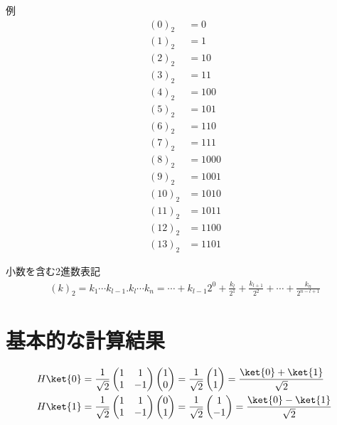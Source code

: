 \documentclass[]{ltjsarticle}
\begin{document}
例
\begin{align}
    (0)_2 &= 0 \\
    (1)_2 &= 1 \\
    (2)_2 &= 10 \\
    (3)_2 &= 11 \\
    (4)_2 &= 100 \\
    (5)_2 &= 101 \\
    (6)_2 &= 110 \\
    (7)_2 &= 111 \\
    (8)_2 &= 1000 \\
    (9)_2 &= 1001 \\
    (10)_2 &= 1010 \\
    (11)_2 &= 1011 \\
    (12)_2 &= 1100 \\
    (13)_2 &= 1101
\end{align}

小数を含む2進数表記
\begin{align}
    (k)_2 
    =
    k_1 \cdots k_{l-1}. k_l \cdots k_n
    =
    \cdots + k_{l-1} 2^{0}
    +
    \frac{k_l}{2^1}
    +
    \frac{k_{l+1}}{2^2}
    +
    \cdots
    +
    \frac{k_n}{2^{n-l+1}}
\end{align}


\section{基本的な計算結果}
\begin{align}
    H \ket{0}
    &=
    \frac{1}{\sqrt{2}}
    \begin{pmatrix}
        1 & 1 \\
        1 & -1
    \end{pmatrix}
    \begin{pmatrix}
        1 \\ 0
    \end{pmatrix}
    =
    \frac{1}{\sqrt{2}}
    \begin{pmatrix}
        1 \\ 1
    \end{pmatrix}
    =
    \frac{\ket{0} + \ket{1}}{\sqrt{2}} \\
    H \ket{1}
    &=
    \frac{1}{\sqrt{2}}
    \begin{pmatrix}
        1 & 1 \\
        1 & -1
    \end{pmatrix}
    \begin{pmatrix}
        0 \\ 1
    \end{pmatrix}
    =
    \frac{1}{\sqrt{2}}
    \begin{pmatrix}
        1 \\ -1
    \end{pmatrix}
    =
    \frac{\ket{0} - \ket{1}}{\sqrt{2}}
\end{align}
\end{document}
